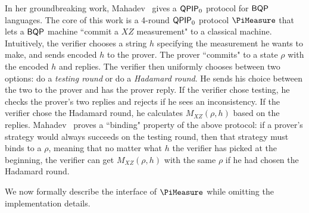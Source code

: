 In her groundbreaking work, Mahadev~\cite{FOCS:Mahadev18a} gives a $\operatorname{\mathsf{QPIP}}_0$ protocol for $\operatorname{\mathsf{BQP}}$ languages.
The core of this work is a 4-round $\operatorname{\mathsf{QPIP}}_0$ protocol $\PiMeasure$ that lets a $\operatorname{\mathsf{BQP}}$ machine ``commit a $XZ$ measurement" to a classical machine.
Intuitively, the verifier chooses a string $h$ specifying  the measurement he wants to make, and sends encoded $h$  to the prover. The prover ``commits" to a state $\rho$ with the encoded $h$ and replies. The verifier then uniformly chooses between two options: do a \emph{testing round} or do a \emph{Hadamard round}. He sends his choice between the two to the prover and has the  prover reply. If the verifier chose testing, he checks the prover's two replies and rejects if he sees an inconsistency. If the verifier chose the Hadamard round, he calculates $M_{XZ}(\rho,h)$ based on the replies. Mahadev~\cite{FOCS:Mahadev18a} proves a ``binding" property of the above protocol: if a prover's strategy would always succeeds on the testing round, then that strategy must binds to a $\rho$, meaning that no matter what $h$ the verifier has picked at the beginning, the verifier can get $M_{XZ}(\rho,h)$  with the same $\rho$ if he had chosen the Hadamard round.

We now formally describe the interface of $\PiMeasure$ while omitting the implementation details.

